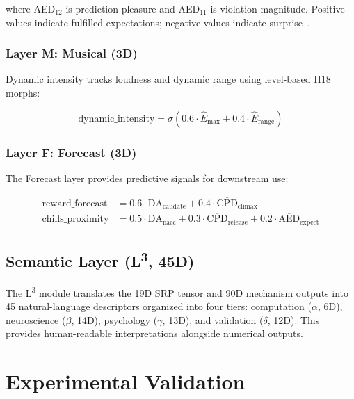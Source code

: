 \documentclass[10pt,twocolumn]{article}
\newcommand{\Ltri}{L\textsuperscript{3}}
\newcommand{\sigmoid}{\sigma}
\begin{document}
\noindent where AED$_{12}$ is prediction pleasure and AED$_{11}$ is violation magnitude. Positive values indicate fulfilled expectations; negative values indicate surprise~\cite{Huron2006}.

\subsubsection{Layer M: Musical (3D)}

Dynamic intensity tracks loudness and dynamic range using level-based H18 morphs:

\begin{equation}
\text{dynamic\_intensity} = \sigmoid\!\left(0.6 \cdot \hat{E}_\text{max} + 0.4 \cdot \hat{E}_\text{range}\right)
\label{eq:dynamic_intensity}
\end{equation}

\subsubsection{Layer F: Forecast (3D)}

The Forecast layer provides predictive signals for downstream use:

\begin{align}
\text{reward\_forecast} &= 0.6 \cdot \text{DA}_\text{caudate} + 0.4 \cdot \overline{\text{CPD}}_\text{climax} \\
\text{chills\_proximity} &= 0.5 \cdot \text{DA}_\text{nacc} + 0.3 \cdot \overline{\text{CPD}}_\text{release} + 0.2 \cdot \overline{\text{AED}}_\text{expect}
\end{align}


\subsection{Semantic Layer (\Ltri{}, 45D)}
\label{sec:l3}

The \Ltri{} module translates the 19D SRP tensor and 90D mechanism outputs into 45 natural-language descriptors organized into four tiers: computation ($\alpha$, 6D), neuroscience ($\beta$, 14D), psychology ($\gamma$, 13D), and validation ($\delta$, 12D). This provides human-readable interpretations alongside numerical outputs.


\section{Experimental Validation}
\label{sec:validation}
\end{document}
